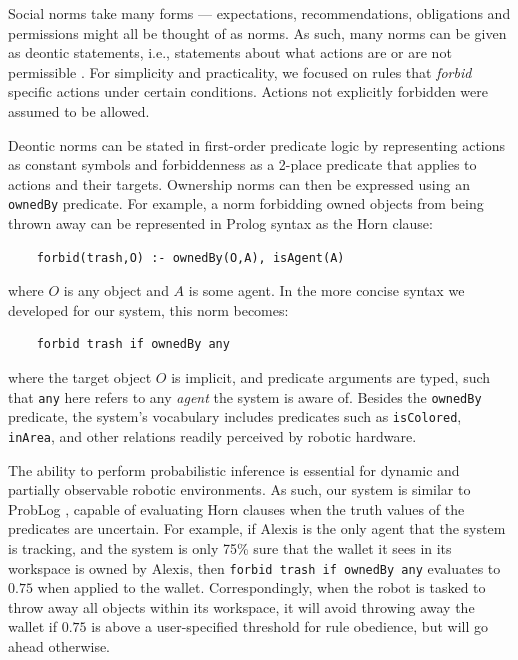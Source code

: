 \documentclass[letterpaper]{article} %
\begin{document}
Social norms take many forms --- expectations, recommendations, obligations and permissions might all be thought of as norms. As such, many norms can be given as deontic statements, i.e., statements about what actions are or are not permissible \cite{malle2017networks}. For simplicity and practicality, we focused on rules that \emph{forbid} specific actions under certain conditions. Actions not explicitly forbidden were assumed to be allowed.

Deontic norms can be stated in first-order predicate logic by representing actions as constant symbols and forbiddenness as a 2-place predicate that applies to actions and their targets. Ownership norms can then be expressed using an \texttt{\small{ownedBy}} predicate. For example, a norm forbidding owned objects from being thrown away can be represented in Prolog syntax as the Horn clause:
\begin{scriptsize}
\begin{verbatim}
    forbid(trash,O) :- ownedBy(O,A), isAgent(A)
\end{verbatim}
\end{scriptsize}
where $O$ is any object and $A$ is some agent. In the more concise syntax we developed for our system, this norm becomes:
\begin{scriptsize}
\begin{verbatim}
    forbid trash if ownedBy any
\end{verbatim}
\end{scriptsize}
where the target object $O$ is implicit, and predicate arguments are typed, such that \texttt{\small{any}} here refers to any \emph{agent} the system is aware of. Besides the \texttt{\small{ownedBy}} predicate, the system's vocabulary includes predicates such as \texttt{\small{isColored}}, \texttt{\small{inArea}}, and other relations readily perceived by robotic hardware.

The ability to perform probabilistic inference is essential for dynamic and partially observable robotic environments. As such, our system is similar to ProbLog \cite{de2007problog,de2010probabilistic}, capable of evaluating Horn clauses when the truth values of the predicates are uncertain. For example, if Alexis is the only agent that the system is tracking, and the system is only 75\% sure that the wallet it sees in its workspace is owned by Alexis, then \texttt{\small{forbid trash if ownedBy any}} evaluates to $0.75$ when applied to the wallet. Correspondingly, when the robot is tasked to throw away all objects within its workspace, it will avoid throwing away the wallet if $0.75$ is above a user-specified threshold for rule obedience, but will go ahead otherwise.
\end{document}

